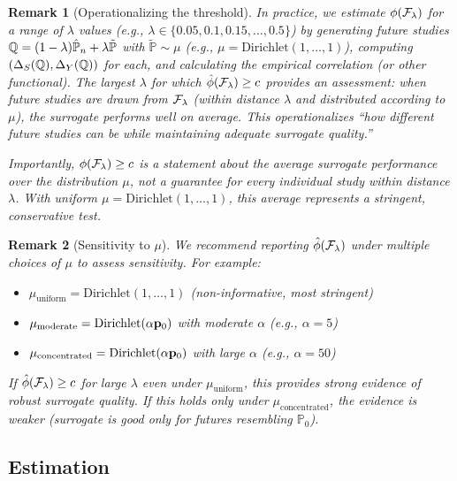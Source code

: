 \documentclass{article}
\newtheorem{remark}{Remark}
\newcommand{\PP}{\mathbb{P}}
\begin{document}
\begin{remark}[Operationalizing the threshold]\label{remark:operational}
In practice, we estimate $\phi(\mathcal{F}_\lambda)$ for a range of $\lambda$ values (e.g., $\lambda \in \{0.05, 0.1, 0.15, \ldots, 0.5\}$) by generating future studies $\Q = (1-\lambda)\hat{\PP}_n + \lambda\tilde{\PP}$ with $\tilde{\PP} \sim \mu$ (e.g., $\mu = \text{Dirichlet}(1, \ldots, 1)$), computing $(\Delta_S(\mathbb{Q}), \Delta_Y(\mathbb{Q}))$ for each, and calculating the empirical correlation (or other functional). The largest $\lambda$ for which $\hat{\phi}(\mathcal{F}_\lambda) \geq c$ provides an assessment: \emph{when future studies are drawn from $\mathcal{F}_\lambda$ (within distance $\lambda$ and distributed according to $\mu$), the surrogate performs well on average.} This operationalizes ``how different future studies can be while maintaining adequate surrogate quality.''

Importantly, $\phi(\mathcal{F}_\lambda) \geq c$ is a statement about the \emph{average} surrogate performance over the distribution $\mu$, not a guarantee for every individual study within distance $\lambda$. With uniform $\mu = \text{Dirichlet}(1, \ldots, 1)$, this average represents a stringent, conservative test.
\end{remark}

\begin{remark}[Sensitivity to $\mu$]\label{remark:mu-sensitivity}
We recommend reporting $\hat{\phi}(\mathcal{F}_\lambda)$ under multiple choices of $\mu$ to assess sensitivity. For example:
\begin{itemize}
    \item $\mu_{\text{uniform}} = \text{Dirichlet}(1, \ldots, 1)$ (non-informative, most stringent)
    \item $\mu_{\text{moderate}} = \text{Dirichlet}(\alpha \mathbf{p}_0)$ with moderate $\alpha$ (e.g., $\alpha = 5$)
    \item $\mu_{\text{concentrated}} = \text{Dirichlet}(\alpha \mathbf{p}_0)$ with large $\alpha$ (e.g., $\alpha = 50$)
\end{itemize}
If $\hat{\phi}(\mathcal{F}_\lambda) \geq c$ for large $\lambda$ even under $\mu_{\text{uniform}}$, this provides strong evidence of robust surrogate quality. If this holds only under $\mu_{\text{concentrated}}$, the evidence is weaker (surrogate is good only for futures resembling $\PP_0$).
\end{remark}

\subsection{Estimation}\label{sec:estimation}
\end{document}
